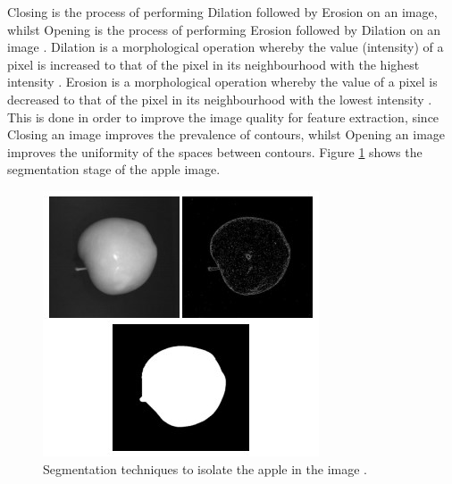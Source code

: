 Closing is the process of performing Dilation followed by Erosion on an image, whilst Opening is the process of performing Erosion followed by Dilation on an image \cite{opening,closing}.
Dilation is a morphological operation whereby the value (intensity) of a pixel is increased to that of the pixel in its neighbourhood with the highest intensity \cite{mathworksdilationerosion}.
Erosion is a morphological operation whereby the value of a pixel is decreased to that of the pixel in its neighbourhood with the lowest intensity \cite{mathworksdilationerosion}.
This is done in order to improve the image quality for feature extraction, since Closing an image improves the prevalence of contours, whilst Opening an image improves the uniformity of the spaces between contours.
Figure \ref{fig:segmentedapples} shows the segmentation stage of the apple image.
\begin{figure}
    \centering
    \includegraphics[width=\linewidth]{segmentedapples.jpg}
    \caption{Segmentation techniques to isolate the apple in the image \cite{comert}.}
    \label{fig:segmentedapples}
\end{figure}

